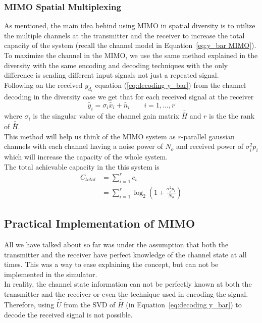 \subsubsection{MIMO Spatial Multiplexing}
As mentioned, the main idea behind using MIMO in spatial diversity is to utilize the multiple channels at the transmitter and the receiver to increase the total capacity of the system (recall the channel model in Equation~\ref{eq:y_bar MIMO}). \\

To maximize the channel in the MIMO, we use the same method explained in the diversity with the same encoding and decoding techniques with the only difference is sending different input signals not just a repeated signal. \\
Following on the received $y_{d_i}$ equation (\ref{eq:decoding y_bar}) from the channel decoding in the diversity case we get that for each received signal at the receiver
\[ \tilde{y_i} = \sigma_i \tilde{x_i} + \tilde{n_i} \qquad i=1,\ldots,r \]
where $\sigma_i$ is the singular value of the channel gain matrix $\bar{\bar{H}}$ and $r$ is the the rank of $\bar{\bar{H}}$.\\
This method will help us think of the MIMO system as $r$-parallel gaussian channels with each channel having a noise power of $N_o$ and received power of $\sigma_i^2 p_i$ which will increase the capacity of the whole system. \\
The total achievable capacity in the this system is
\begin{equation}
    \label{eq:C sum in perfect knowledge}
    \begin{aligned}
        C_{total} &= \sum_{i=1}^{r} c_i \\
        &= \sum_{i=1}^{r} \log_2 \left( 1 + \frac{\sigma^2_i p_i}{N_o} \right)
    \end{aligned}
\end{equation}

\subsection{Practical Implementation of MIMO}
All we have talked about so far was under the assumption that both the transmitter and the receiver have perfect knowledge of the channel state at all times. This was a way to ease explaining the concept, but can not be implemented in the simulator.\\

In reality, the channel state information can not be perfectly known at both the transmitter and the receiver or even the technique used in encoding the signal. Therefore, using $\bar{\bar{U}}$ from the SVD of $\bar{\bar{H}}$ (in Equation~\ref{eq:decoding y_bar}) to decode the received signal is not possible.
